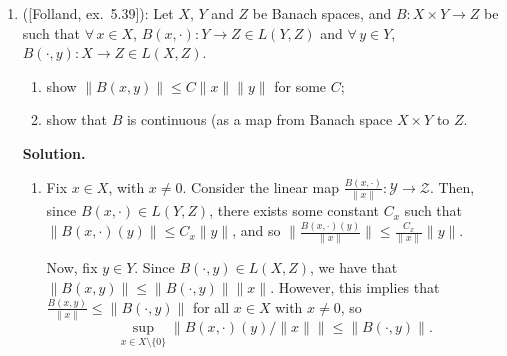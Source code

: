 \documentclass[11pt]{article}
\begin{document}
\begin{enumerate}
Also, $\|x\| = \sum_{n=1}^{\infty} \frac{1}{n^2} = \pi^2 / 6$, so $x \in \ell^{1}$.
However, $\sum_{n=1}^{\infty}n |(x)_n| = \sum_{n=1}^{\infty} \frac{1}{n} = \infty$, so $x \not\in Y$.
Therefore, we have a sequence in $Y$, $\{x^{(N)}\}_{N=1}^{\infty} $ which converges to $x$, but $x \not\in  Y$.
Therefore, $Y$ is not closed, so it is not complete, so it is not Banach.
Even if $T : Y \to \ell^{1}$ is closed, the hypothesis of the closed graph theorem that both $Y$ and $\ell^{1}$ are banach is not satisfied.

\item ([Folland, ex.\ 5.39]): Let $X$, $Y$ and $Z$ be Banach spaces, and $B:X\times Y\to Z$ be such
that $\forall\, x\in X$, $B(x,\cdot):Y\to Z \in L(Y,Z)$ and $\forall\, y\in Y$, $B(\cdot,y):X\to Z \in L(X,Z)$.
\begin{enumerate}
\item show $\|B(x,y)\|\le C\|x\|\|y\|$ for some $C$;
\item show that $B$ is continuous (as a map from Banach space $X\times Y$ to $Z$.
\end{enumerate}

\textbf{Solution.}

\begin{enumerate}
    \item Fix $x \in X$, with $x \neq 0$.
        Consider the linear map $\frac{B(x, \cdot)}{\|x\|} : \mathcal{Y} \to \mathcal{Z}$.
        Then, since $B(x, \cdot) \in L(Y, Z)$, there exists some constant $C_x$ such that $\|B(x, \cdot)(y)\| \leq C_x \|y\|$, and so $\|\frac{B(x, \cdot)(y)}{\|x\|}\| \leq \frac{C_x}{\|x\|} \|y\|$.

        Now, fix $y \in Y$.
        Since $B(\cdot, y) \in L(X, Z)$, we have that $\|B(x, y)\| \leq \|B(\cdot, y)\| \|x\|$.
        However, this implies that $\frac{B(x, y)}{\|x\|} \leq \|B(\cdot, y)\|$ for all $x \in X$ with $x \neq 0$, so
        \[
            \sup_{x \in X \setminus \{0\} } \|B(x, \cdot)(y) / \|x\|\| \leq \|B(\cdot, y)\|
        .\] 
        

\end{enumerate}
\end{enumerate}
\end{document}
